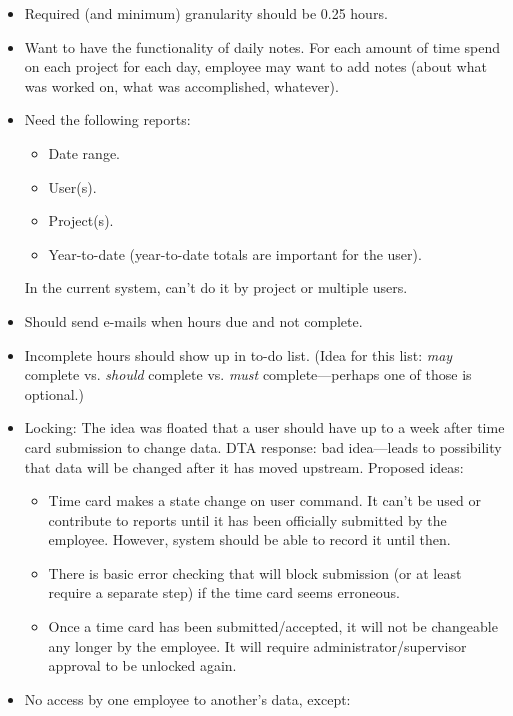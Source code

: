\begin{itemize}
\item Required (and minimum) granularity should be 0.25 hours.
\item Want to have the functionality of daily notes.  For each amount of time
      spend on each project for each day, employee may want to add notes (about
      what was worked on, what was accomplished, whatever).
\item Need the following reports:
      \begin{itemize}
      \item Date range.
      \item User(s).
      \item Project(s).
      \item Year-to-date (year-to-date totals are important for the user).
      \end{itemize}
      In the current system, can't do it by project or multiple users.
\item Should send e-mails when hours due and not complete.
\item Incomplete hours should show up in to-do list.  (Idea for this list:
      \emph{may} complete vs. \emph{should} complete vs. \emph{must}
      complete---perhaps one of those is optional.)
\item Locking:  The idea was floated that a user should have up to
      a week after time card submission to change data.  DTA response:
      bad idea---leads to possibility that data will be changed after it
      has moved upstream.  Proposed ideas:
      \begin{itemize}
      \item Time card makes a state change on user command.  It can't be
            used or contribute to reports until it has been officially submitted
            by the employee.  However, system should be able to record it until then.
      \item There is basic error checking that will block submission (or at least
            require a separate step) if the time card seems erroneous.
      \item Once a time card has been submitted/accepted, it will not be
            changeable any longer by the employee.  It will require administrator/supervisor
            approval to be unlocked again.
      \end{itemize} 
\item No access by one employee to another's data, except:
      \begin{itemize}

\end{itemize}
\end{itemize}
